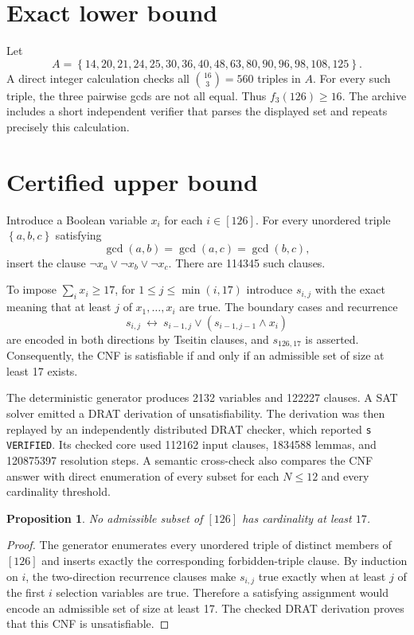 \documentclass[11pt]{amsart}
\newtheorem{proposition}[theorem]{Proposition}
\newcommand{\set}[1]{\left\{#1\right\}}
\begin{document}
\section{Exact lower bound}
Let
\begin{equation}\label{eq:witness}
A=\set{14,20,21,24,25,30,36,40,48,63,80,90,96,98,108,125}.
\end{equation}
A direct integer calculation checks all $\binom{16}{3}=560$ triples in $A$.
For every such triple, the three pairwise gcds are not all equal. Thus
$f_3(126)\geq16$. The archive includes a short independent verifier that
parses the displayed set and repeats precisely this calculation.

\section{Certified upper bound}
Introduce a Boolean variable $x_i$ for each $i\in[126]$. For every unordered
triple $\set{a,b,c}$ satisfying
\[
 \gcd(a,b)=\gcd(a,c)=\gcd(b,c),
\]
insert the clause $\neg x_a\lor\neg x_b\lor\neg x_c$. There are 114345 such
clauses.

To impose $\sum_i x_i\geq17$, for $1\leq j\leq\min(i,17)$ introduce
$s_{i,j}$ with the exact meaning that at least $j$ of $x_1,\ldots,x_i$ are
true. The boundary cases and recurrence
\[
s_{i,j}\ \longleftrightarrow\
s_{i-1,j}\lor(s_{i-1,j-1}\land x_i)
\]
are encoded in both directions by Tseitin clauses, and $s_{126,17}$ is
asserted. Consequently, the CNF is satisfiable if and only if an admissible set
of size at least 17 exists.

The deterministic generator produces 2132 variables and 122227 clauses. A SAT
solver emitted a DRAT derivation of unsatisfiability. The derivation was then
replayed by an independently distributed DRAT checker, which reported
\texttt{s VERIFIED}. Its checked core used 112162 input clauses, 1834588
lemmas, and 120875397 resolution steps. A semantic cross-check also compares
the CNF answer with direct enumeration of every subset for each $N\leq12$ and
every cardinality threshold.

\begin{proposition}\label{prop:upper}
No admissible subset of $[126]$ has cardinality at least $17$.
\end{proposition}
\begin{proof}
The generator enumerates every unordered triple of distinct members of
$[126]$ and inserts exactly the corresponding forbidden-triple clause. By
induction on $i$, the two-direction recurrence clauses make $s_{i,j}$ true
exactly when at least $j$ of the first $i$ selection variables are true.
Therefore a satisfying assignment would encode an admissible set of size at
least 17. The checked DRAT derivation proves that this CNF is unsatisfiable.
\end{proof}
\end{document}
